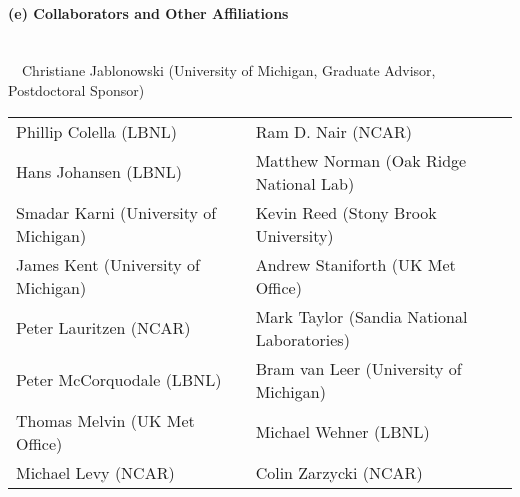 \documentclass[11pt]{article}
\begin{document}
\vspace{-0.3cm}
\paragraph{\large (e) Collaborators and Other Affiliations}\ \\

\ \ Christiane Jablonowski (University of Michigan, Graduate Advisor, Postdoctoral Sponsor)

\noindent
\begin{tabular}{p{3.25in}p{3.25in}}
Phillip Colella (LBNL) & Ram D. Nair (NCAR) \\
Hans Johansen (LBNL) & Matthew Norman (Oak Ridge National Lab) \\
Smadar Karni (University of Michigan) & Kevin Reed (Stony Brook University) \\
James Kent (University of Michigan) & Andrew Staniforth (UK Met Office) \\
Peter Lauritzen (NCAR) & Mark Taylor (Sandia National Laboratories) \\
Peter McCorquodale (LBNL) & Bram van Leer (University of Michigan) \\
Thomas Melvin (UK Met Office) & Michael Wehner (LBNL) \\
Michael Levy (NCAR) & Colin Zarzycki (NCAR)
\end{tabular}
\end{document}
